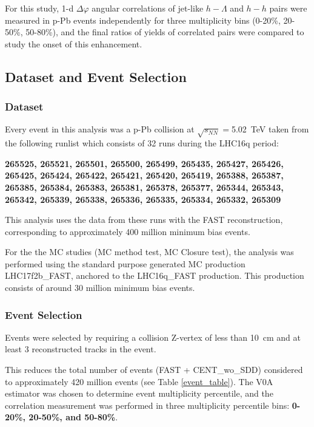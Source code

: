 \documentclass[ALICE,manyauthors]{ALICE_analysis_notes}
\begin{document}
For this study, 1-d $\Delta\varphi$ angular correlations of jet-like $h-\Lambda$ and $h-h$ pairs were measured in p-Pb events independently for three multiplicity bins (0-20\%, 20-50\%, 50-80\%), and the final ratios of yields of correlated pairs were compared to study the onset of this enhancement. 


\subsection{Dataset and Event Selection}

\subsubsection{Dataset}

Every event in this analysis was a p-Pb collision at $\sqrt{s_{NN}} =$\SI{5.02}{TeV} taken from the following runlist which consists of 32 runs during the LHC16q period:

\textbf{265525, 265521, 265501, 265500, 265499, 265435, 265427, 265426, 265425, 265424, 265422, 265421, 265420, 265419, 265388, 265387, 265385, 265384, 265383, 265381, 265378, 265377, 265344, 265343, 265342, 265339, 265338, 265336, 265335, 265334, 265332, 265309}


This analysis uses the data from these runs with the FAST reconstruction, corresponding to approximately 400 million minimum bias events.

For the the MC studies (MC method test, MC Closure test), the analysis was performed using the standard purpose generated MC production LHC17f2b\_FAST, anchored to the LHC16q\_FAST production. This production consists of around 30 million minimum bias events.

\subsubsection{Event Selection}

Events were selected by requiring a collision Z-vertex of less than \SI{10}{cm} and at least 3 reconstructed tracks in the event.  

This reduces the total number of events (FAST + CENT\_wo\_SDD) considered to approximately 420 million events (see Table \ref{event_table}). The V0A estimator was chosen to determine event multiplicity percentile, and the correlation measurement was performed in three multiplicity percentile bins: \textbf{0-20\%, 20-50\%, and 50-80\%}.
\end{document}
